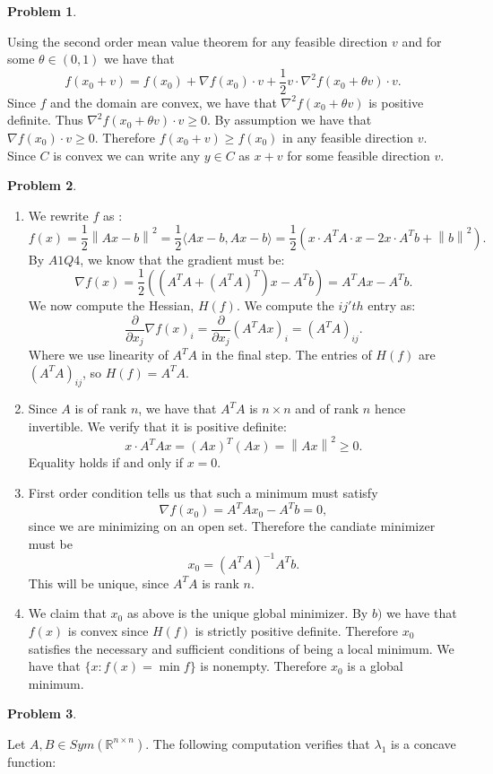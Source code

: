 \documentclass[12pt, a4paper]{article}
\title{}
\author{A.N.}
\date{\today}
\newtheorem{problem}{Problem}
\theoremstyle{definition}
\newcommand{\penum}{ \begin{enumerate}[label=\bf(\alph*), leftmargin=0pt]}
\newcommand{\epenum}{ \end{enumerate} }
\newcommand{\R}{\mathbb{R}}                           %
\newcommand{\grad}{\nabla}
\newcommand{\lan}{\langle}
\newcommand{\ran}{\rangle}
\newcommand{\norm}[1]{\left\lVert#1\right\rVert}
\newcommand{\inn}[1]{\lan#1\ran}
\begin{document}
\begin{problem}
\end{problem}
Using the second order mean value theorem for any feasible direction $v$ and for some $\theta \in(0,1)$ we have that 
$$f(x_0 + v ) = f(x_0) + \grad f(x_0)\cdot v + \frac{1}{2} v \cdot \grad^2 f(x_0 + \theta v)\cdot v.$$
Since $f$ and the domain are convex, we have that $ \grad^2 f(x_0 + \theta v )$ is positive definite. Thus $\grad^2 f(x_0 + \theta v)\cdot v \geq 0$. By assumption we have that $\grad f(x_0)\cdot v \geq 0$. Therefore $f(x_0 + v) \geq f(x_0)$ in any feasible direction $v$. Since $C$ is convex we can write any $y\in C$ as $x+v$ for some feasible direction $v$.  
\newpage
\begin{problem}
\end{problem}
\penum 
\item We rewrite $f$ as :$$f(x) = \frac{1}{2} \norm{Ax - b}^2 =  \frac{1}{2} \inn{Ax - b, Ax - b}= \frac{1}{2} \left(x \cdot A^T A\cdot  x - 2x \cdot A^T b + \norm{b}^2 	\right).$$
By $A1Q4$, we know that the gradient must be: 
$$\grad f(x) = \frac{1}{2} \left( (A^TA + (A^TA)^T)x - A^Tb \right) = A^TAx - A^Tb.$$
We now compute the Hessian, $H(f)$. We compute the $ij'th$ entry as: 
$$\frac{\partial}{\partial x_j}\grad f(x)_i = \frac{\partial}{\partial x_j }(A^T Ax)_i = (A^TA)_{ij}.$$
Where we use linearity of $A^TA$ in the final step. The entries of $H(f) $ are $(A^TA)_{ij}$, so $H(f) = A^TA$. 
\item 
Since $A$ is of rank $n$, we have that $A^TA$ is $n \times n$ and of rank $n$ hence invertible. We verify that it is positive definite: 
$$x \cdot A^T A x = (Ax)^T(Ax) = \norm{Ax}^2 \geq 0.$$
Equality holds if and only if $x= 0$. 
\item First order condition tells us that such a minimum must satisfy $$\grad f(x_0) = A^T A x_0  - A^T b = 0,$$
since we are minimizing on an open set. Therefore the candiate minimizer must be $$x_0 = (A^T A)^{-1}A^T b.$$
This will be unique, since $A^TA$ is rank $n$. 
\item 
We claim that $x_0$ as above is the unique global minimizer. By $b)$ we have that $f(x)$ is convex since $H(f)$ is strictly positive definite. Therefore $x_0$ satisfies the necessary and sufficient conditions of being a local minimum. We have that $\{x: f(x) = \min f\}$ is nonempty. Therefore $x_0$ is a global minimum. 
\epenum
\newpage
\begin{problem}
\end{problem}
Let $A,B \in Sym(\R^{n \times n})$. The following computation verifies that $\lambda_1$ is a concave function: 
\end{document}

